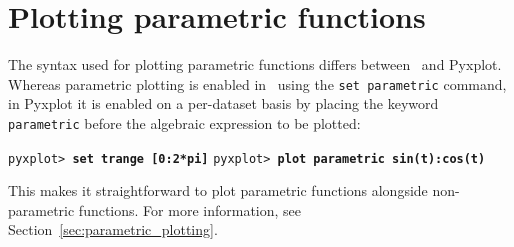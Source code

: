 \section{Plotting parametric functions}

The syntax used for plotting parametric functions differs between \gnuplot\ and
Pyxplot. Whereas parametric plotting is enabled in \gnuplot\ using the {\tt set
parametric} command, in Pyxplot it is enabled on a per-dataset basis by placing
the keyword {\tt parametric} before the algebraic expression to be plotted:

\vspace{3mm}
\newline
{}\newline
{}
\vspace{3mm}\newline
\noindent\texttt{pyxplot> \textbf{set trange [0:2*pi]}}\newline
\noindent\texttt{pyxplot> \textbf{plot parametric sin(t):cos(t)}}
\vspace{3mm}

\noindent This makes it straightforward to plot parametric functions alongside
non-parametric functions. For more information, see
Section~\ref{sec:parametric_plotting}.


